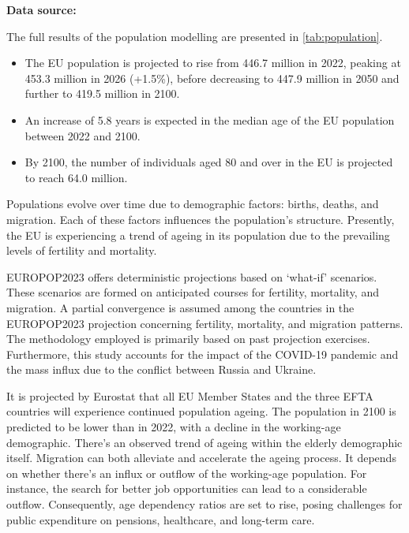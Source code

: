 \textbf{Data source:}~\cite{eurostat2023population}


The full results of the population modelling are presented in
\autoref{tab:population}.


\begin{itemize}
      \item The EU population is projected to rise from 446.7 million in 2022, peaking at
            453.3 million in 2026 (+1.5\%), before decreasing to 447.9 million in 2050 and
            further to 419.5 million in 2100.
      \item An increase of 5.8 years is expected in the median age of the EU population
            between 2022 and 2100.
      \item By 2100, the number of individuals aged 80 and over in the EU is projected to
            reach 64.0 million.
\end{itemize}

Populations evolve over time due to demographic factors: births, deaths, and
migration. Each of these factors influences the population's structure.
Presently, the EU is experiencing a trend of ageing in its population due to
the prevailing levels of fertility and mortality.

EUROPOP2023 offers deterministic projections based on `what-if' scenarios.
These scenarios are formed on anticipated courses for fertility, mortality, and
migration. A partial convergence is assumed among the countries in the
EUROPOP2023 projection concerning fertility, mortality, and migration patterns.
The methodology employed is primarily based on past projection exercises.
Furthermore, this study accounts for the impact of the COVID-19 pandemic and
the mass influx due to the conflict between Russia and Ukraine.

It is projected by Eurostat that all EU Member States and the three EFTA
countries will experience continued population ageing. The population in 2100
is predicted to be lower than in 2022, with a decline in the working-age
demographic. There's an observed trend of ageing within the elderly demographic
itself. Migration can both alleviate and accelerate the ageing process. It
depends on whether there's an influx or outflow of the working-age population.
For instance, the search for better job opportunities can lead to a
considerable outflow. Consequently, age dependency ratios are set to rise,
posing challenges for public expenditure on pensions, healthcare, and long-term
care.

